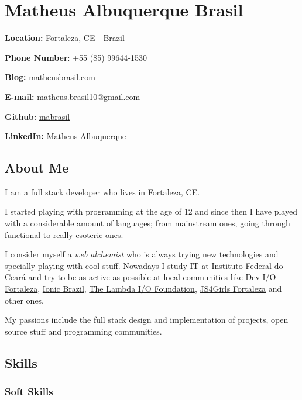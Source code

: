 \documentclass[]{article}
\date{}
\begin{document}
\section{Matheus Albuquerque Brasil}\label{matheus-albuquerque-brasil}

\textbf{Location:} Fortaleza, CE - Brazil

\textbf{Phone Number}: +55 (85) 99644-1530

\textbf{Blog:} \href{http://matheusbrasil.com}{matheusbrasil.com}

\textbf{E-mail:} matheus.brasil10@gmail.com

\textbf{Github:} \href{https://github.com/mabrasil}{mabrasil}

\textbf{LinkedIn:}
\href{https://www.linkedin.com/in/matheusalbuquerque}{Matheus
Albuquerque}

\subsection{About Me}\label{about-me}

I am a full stack developer who lives in
\href{http://pt.wikipedia.org/wiki/Fortaleza}{Fortaleza, CE}.

I started playing with programming at the age of 12 and since then I
have played with a considerable amount of languages; from mainstream
ones, going through functional to really esoteric ones.

I consider myself a \emph{web alchemist} who is always trying new
technologies and specially playing with cool stuff. Nowadays I study IT
at Instituto Federal do Ceará and try to be as active as possible at
local communities like
\href{https://www.facebook.com/groups/fortalezadevelopers/}{Dev I/O
Fortaleza}, \href{http://ionicbrazil.com/}{Ionic Brazil},
\href{https://github.com/lambda-io}{The Lambda I/O Foundation},
\href{http://js4girls-fortaleza.github.io/}{JS4Girls Fortaleza} and
other ones.

My passions include the full stack design and implementation of
projects, open source stuff and programming communities.

\subsection{Skills}\label{skills}

\subsubsection{Soft Skills}\label{soft-skills}
\end{document}
